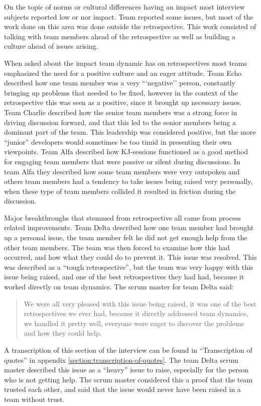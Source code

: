 \label{question-19}
On the topic of norms or cultural differences having an impact most interview subjects reported low or nor impact. Team  reported some issues, but most of the work done on this area was done outside the retrospective. This work consisted of talking with team members ahead of the retrospective as well as building a culture ahead of issues arising. 

\label{question-20}
When asked about the impact team dynamic has on retrospectives most teams emphasized the need for a positive culture and an eager attitude. Team Echo described how one team member was a very ```negative'' person, constantly bringing up problems that needed to be fixed, however in the context of the retrospective this was seen as a positive, since it brought up necessary issues. Team Charlie described how the senior team members was a strong force in driving discussion forward, and that this led to the senior members being a dominant part of the team. This leadership was considered positive, but the more ``junior'' developers would sometimes be too timid in presenting their own viewpoints. Team Alfa described how KJ-sessions functioned as a good method for engaging team members that were passive or silent during discussions. In team Alfa they described how some team members were very outspoken and others team members had a tendency to take issues being raised very personally, when these type of team members collided it resulted in friction during the discussion. 

\label{question-21}
Major breakthroughs that stemmed from retrospective all came from process related improvements. Team Delta described how one team member had brought up a personal issue, the team member felt he did not get enough help from the other team members. The team was then forced to examine how this had occurred, and how what they could do to prevent it. This issue was resolved. This was described as a ``tough retrospective'', but the team was very happy with this issue being raised, and one of the best retrospectives they had had, because it worked directly on team dynamics. The scrum master for team Delta said:

\begin{quote}
We were all very pleased with this issue being raised, it was one of the best retrospectives we ever had, because it directly addressed team dynamics, we handled it pretty well, everyone were eager to discover the problems and how they could help.
\end{quote}

A transcription of this section of the interview can be found in ``Transcription of quotes'' in appendix \autoref{section:transcription-of-quotes}.
The team Delta scrum master described this issue as a ``heavy'' issue to raise, especially for the person who is not getting help. The scrum master considered this a proof that the team trusted each other, and said that the issue would never have been raised in a team without trust.